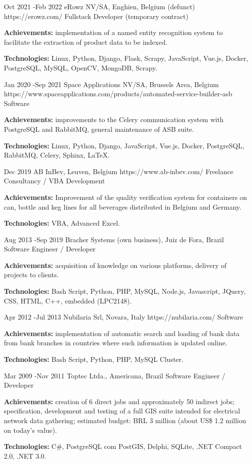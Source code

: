 \documentclass[10pt]{article} %
\begin{document}
\job
{Oct 2021 -}{Feb 2022}
{eRowz  NV/SA, Enghien, Belgium (defunct)}
{https://erowz.com/}
{Fullstack Developer (temporary contract)}
{\rule{0mm}{2mm}\textbf{Achievements:} implementation of a named entity recognition system to facilitate the extraction of product data to be indexed.\\
\rule{0mm}{3mm}\textbf{Technologies:} Linux, Python, Django, Flask, Scrapy, JavaScript, Vue.js, Docker, PostgreSQL, MySQL, OpenCV, MongoDB, Scrapy.}

\job
{Jan 2020 -}{Sep 2021}
{Space Applications NV/SA, Brussels Area, Belgium}
{https://www.spaceapplications.com/products/automated-service-builder-asb}
{Software }
{\rule{0mm}{2mm}\textbf{Achievements:} improvements to the Celery communication system with PostgreSQL and RabbitMQ, general maintenance of ASB suite.\\
\rule{0mm}{3mm}\textbf{Technologies:} Linux, Python, Django, JavaScript, Vue.js, Docker, PostgreSQL, RabbitMQ, Celery, Sphinx, LaTeX.}

\job
{Dec 2019}{}
{AB InBev, Leuven, Belgium}
{https://www.ab-inbev.com/}
{Freelance Consultancy / VBA Development}
{\rule{0mm}{2mm}\textbf{Achievements:} Improvement of the quality verification system for containers on can, bottle and keg lines for all beverages distributed in Belgium and Germany.\\
\rule{0mm}{3mm}\textbf{Technologies:} VBA, Advanced Excel.}

\job
{Aug 2013 -}{Sep 2019}
{Bracher Systems (own business), Juiz de Fora, Brazil}
{}
{Software Engineer / Developer}
{\rule{0mm}{2mm}\textbf{Achievements:} acquisition of knowledge on various platforms, delivery of projects to clients.\\
\rule{0mm}{3mm}\textbf{Technologies:} Bash Script, Python, PHP, MySQL, Node.js, Javascript, JQuery, CSS, HTML, C++, embedded (LPC2148).}

\job
{Apr 2012 -}{Jul 2013}
{Nubilaria Srl, Novara, Italy}
{https://nubilaria.com/}
{Software }
{\rule{0mm}{2mm}\textbf{Achievements:} implementation of automatic search and loading of bank data from bank branches in countries where such information is updated online.\\
\rule{0mm}{3mm}\textbf{Technologies:} Bash Script, Python, PHP, MySQL Cluster.}

\job
{Mar 2009 -}{Nov 2011}
{Toptec Ltda., Americana, Brazil}
{}
{Software Engineer / Developer}
{\rule{0mm}{2mm}\textbf{Achievements:} creation of 6 direct jobs and approximately 50 indirect jobs; specification, development and testing of a full GIS suite intended for electrical network data gathering; estimated budget: BRL 3 million (about US\$ 1.2 million on today’s value). \\
\rule{0mm}{3mm}\textbf{Technologies:} C\#, PostgreSQL com PostGIS, Delphi, SQLite, .NET Compact 2.0, .NET 3.0.}




\end{document}
